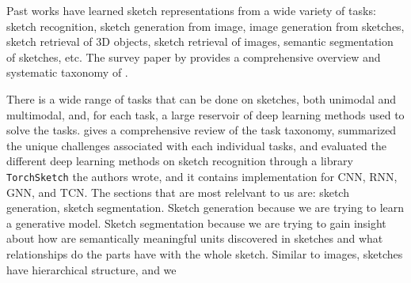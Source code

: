 Past works have learned sketch representations from a wide variety of tasks: sketch recognition, sketch generation from image, image generation from sketches, sketch retrieval of 3D objects, sketch retrieval of images, semantic segmentation of sketches, etc. 
The survey paper by \citet{sketchsurvey} provides a comprehensive overview and systematic taxonomy of . 

There is a wide range of tasks that can be done on sketches, both unimodal and multimodal, and, for each task, a large reservoir of deep learning methods used to solve the tasks. 
\citet{sketchsurvey} gives a comprehensive review of the task taxonomy, summarized the unique challenges associated with each individual tasks, and evaluated the different deep learning methods on sketch recognition through a library \texttt{TorchSketch} the authors wrote, and it contains implementation for CNN, RNN, GNN, and TCN. The sections that are most relelvant to us are: sketch generation, sketch segmentation. Sketch generation because we are trying to learn a generative model. Sketch segmentation because we are trying to gain insight about how are semantically meaningful units discovered in sketches and what relationships do the parts have with the whole sketch.      
Similar to images, sketches have hierarchical structure, and we 




